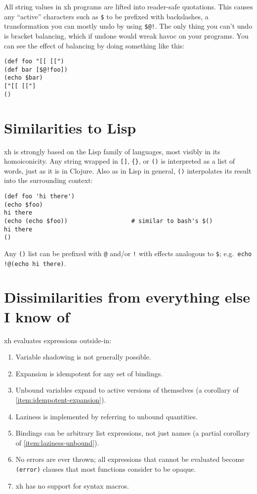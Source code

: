 \documentclass{report}
\begin{document}
  All string values in xh programs are lifted into reader-safe quotations. This
  causes any ``active'' characters such as \verb|$| to be prefixed with
  backslashes, a transformation you can mostly undo by using \verb|$@!|. The
  only thing you can't undo is bracket balancing, which if undone would wreak
  havoc on your programs. You can see the effect of balancing by doing
  something like this:

\begin{verbatim}
(def foo "[[ [[")
(def bar [$@!foo])
(echo $bar)
["[[ [["]
()
\end{verbatim}

\chapter{Similarities to Lisp}\label{chp:similarities-to-lisp}
  xh is strongly based on the Lisp family of languages, most visibly in its
  homoiconicity. Any string wrapped in \verb|[]|, \verb|{}|, or \verb|()| is
  interpreted as a list of words, just as it is in Clojure. Also as in Lisp in
  general, \verb|()| interpolates its result into the surrounding context:

\begin{verbatim}
(def foo 'hi there')
(echo $foo)
hi there
(echo (echo $foo))                  # similar to bash's $()
hi there
()
\end{verbatim}

  Any \verb|()| list can be prefixed with \verb|@| and/or \verb|!| with effects
  analogous to \verb|$|; e.g.~\verb|echo !@(echo hi there)|.

\chapter{Dissimilarities from everything else I know of}\label{chp:dissimilarities}
  xh evaluates expressions outside-in:

\begin{enumerate}
\item{Variable shadowing is not generally possible.}
       \label{item:no-variable-shadowing}
\item{Expansion is idempotent for any set of bindings.}
       \label{item:idempotent-expansion}
\item{Unbound variables expand to active versions of themselves (a}
       corollary of \ref{item:idempotent-expansion}).
       \label{item:unbound-expansion}
\item{Laziness is implemented by referring to unbound quantities.}
       \label{item:laziness-unbound}
\item{Bindings can be arbitrary list expressions, not just names (a}
       partial corollary of \ref{item:laziness-unbound}).
       \label{item:arbitrary-bindings}
\item{No errors are ever thrown; all expressions that cannot be evaluated}
       become \verb|(error)| clauses that most functions consider to be
       opaque.
       \label{item:no-errors}
\item{xh has no support for syntax macros.}
       \label{item:no-macros}
\end{enumerate}
\end{document}
